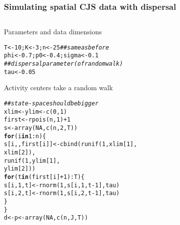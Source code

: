 \documentclass[color=usenames,dvipsnames]{beamer}\usepackage[]{graphicx}\usepackage[]{color}
\makeatletter
\newcommand{\hlnum}[1]{\textcolor[rgb]{0.69,0.494,0}{#1}}%
\newcommand{\hlcom}[1]{\textcolor[rgb]{0.514,0.506,0.514}{\textit{#1}}}%
\newcommand{\hlopt}[1]{\textcolor[rgb]{0,0,0}{#1}}%
\newcommand{\hlstd}[1]{\textcolor[rgb]{0,0,0}{#1}}%
\newcommand{\hlkwa}[1]{\textcolor[rgb]{0,0,0}{\textbf{#1}}}%
\newcommand{\hlkwb}[1]{\textcolor[rgb]{0,0.341,0.682}{#1}}%
\newcommand{\hlkwd}[1]{\textcolor[rgb]{0.004,0.004,0.506}{#1}}%
\newenvironment{kframe}{%
 \def\at@end@of@kframe{}%
 \ifinner\ifhmode%
  \def\at@end@of@kframe{\end{minipage}}%
  \begin{minipage}{\columnwidth}%
 \fi\fi%
 \def\FrameCommand##1{\hskip\@totalleftmargin \hskip-\fboxsep
 \colorbox{shadecolor}{##1}\hskip-\fboxsep
     \hskip-\linewidth \hskip-\@totalleftmargin \hskip\columnwidth}%
 \MakeFramed {\advance\hsize-\width
   \@totalleftmargin\z@ \linewidth\hsize
   \@setminipage}}%
 {\par\unskip\endMakeFramed%
 \at@end@of@kframe}
\newenvironment{knitrout}{}{} %
\makeatother
\begin{document}
\begin{frame}[fragile]
  \frametitle{Simulating spatial CJS data with dispersal}
  \begin{columns}
    \footnotesize %
    \begin{column}{0.5\textwidth}%
    Parameters and data dimensions
\begin{knitrout}\tiny
{}\color{fgcolor}\begin{kframe}
\begin{alltt}
\hlstd{T} \hlkwb{<-} \hlnum{10}\hlstd{; K} \hlkwb{<-} \hlnum{3}\hlstd{; n} \hlkwb{<-} \hlnum{25} \hlcom{## same as before}
\hlstd{phi} \hlkwb{<-} \hlnum{0.7}\hlstd{; p0} \hlkwb{<-} \hlnum{0.4}\hlstd{; sigma} \hlkwb{<-} \hlnum{0.1}
\hlcom{## dispersal parameter (of random walk)}
\hlstd{tau} \hlkwb{<-} \hlnum{0.05}
\end{alltt}
\end{kframe}
\end{knitrout}
\pause
Activity centers take a random walk
\begin{knitrout}\tiny
{}\color{fgcolor}\begin{kframe}
\begin{alltt}
\hlcom{## state-space should be bigger}
\hlstd{xlim} \hlkwb{<-} \hlstd{ylim} \hlkwb{<-} \hlkwd{c}\hlstd{(}\hlnum{0}\hlstd{,} \hlnum{1}\hlstd{)}
\hlstd{first} \hlkwb{<-} \hlkwd{rpois}\hlstd{(n,} \hlnum{1}\hlstd{)}\hlopt{+}\hlnum{1}
\hlstd{s} \hlkwb{<-} \hlkwd{array}\hlstd{(}\hlnum{NA}\hlstd{,} \hlkwd{c}\hlstd{(n,} \hlnum{2}\hlstd{, T))}
\hlkwa{for}\hlstd{(i} \hlkwa{in} \hlnum{1}\hlopt{:}\hlstd{n) \{}
    \hlstd{s[i,,first[i]]} \hlkwb{<-} \hlkwd{cbind}\hlstd{(}\hlkwd{runif}\hlstd{(}\hlnum{1}\hlstd{, xlim[}\hlnum{1}\hlstd{],}
                                  \hlstd{xlim[}\hlnum{2}\hlstd{]),}
                            \hlkwd{runif}\hlstd{(}\hlnum{1}\hlstd{, ylim[}\hlnum{1}\hlstd{],}
                                  \hlstd{ylim[}\hlnum{2}\hlstd{]))}
    \hlkwa{for}\hlstd{(t} \hlkwa{in} \hlstd{(first[i]}\hlopt{+}\hlnum{1}\hlstd{)}\hlopt{:}\hlstd{T) \{}
        \hlstd{s[i,}\hlnum{1}\hlstd{,t]} \hlkwb{<-} \hlkwd{rnorm}\hlstd{(}\hlnum{1}\hlstd{, s[i,}\hlnum{1}\hlstd{,t}\hlopt{-}\hlnum{1}\hlstd{], tau)}
        \hlstd{s[i,}\hlnum{2}\hlstd{,t]} \hlkwb{<-} \hlkwd{rnorm}\hlstd{(}\hlnum{1}\hlstd{, s[i,}\hlnum{2}\hlstd{,t}\hlopt{-}\hlnum{1}\hlstd{], tau)}
    \hlstd{\}}
\hlstd{\}}
\hlstd{d} \hlkwb{<-} \hlstd{p} \hlkwb{<-} \hlkwd{array}\hlstd{(}\hlnum{NA}\hlstd{,} \hlkwd{c}\hlstd{(n, J, T))}

\end{alltt}
\end{kframe}
\end{knitrout}
\end{column}
\end{columns}
\end{frame}
\end{document}
